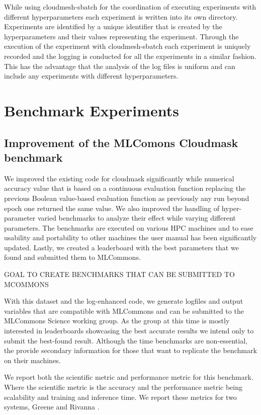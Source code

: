 \documentclass[sigplan,screen]{acmart}
\begin{document}
While using cloudmesh-sbatch for the coordination of executing experiments with different hyperparameters each experiment is written into its own directory. Experiments are identified by a unique identifier that is created by the hyperparameters and their values representing the experiment. Through the execution of the experiment with cloudmesh-sbatch each experiment is uniquely recorded and the logging is conducted for all the experiments in a similar fashion. This has the advantage that the analysis of the log files is uniform and can include any experiments with different hyperparameters.


\section{Benchmark Experiments}




\subsection{Improvement of the MLComons Cloudmask benchmark}

We improved the existing code for cloudmask \cite{Thiyagalingam2022AIBF} significantly while 
numerical accuracy value that is based on a continuous evaluation function replacing the previous Boolean value-based evaluation function as previously any run beyond epoch one returned the same value. We also improved the handling of hyper-parameter varied benchmarks to analyze their effect while varying different parameters. The benchmarks are executed on various HPC machines and to ease usability and portability to other machines the user manual has been significantly updated. Lastly, we created a leaderboard with the best parameters that we found and submitted them to MLCommons.


GOAL TO CREATE BENCHMARKS THAT CAN BE SUBMITTED TO MCOMMONS

With this dataset and the log-enhanced code, we generate logfiles and output variables that are compatible with MLCommons and can be submitted to the MLCommons Science working group. As the group at this time is mostly interested in leaderboards showcasing the best accurate results we intend only to submit the best-found result. Although the time benchmarks are non-essential, the provide secondary information for those that want to replicate the benchmark on their machines. 



We report both the scientific metric and performance metric for this benchmark. Where the scientific metric is the accuracy and the performance metric being scalability and training and inference time. We report these metrics for two systems, Greene \cite{www-greene} and Rivanna \cite{www-rivanna}.
\end{document}
